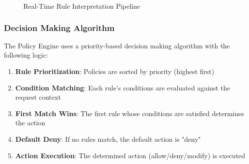 \begin{figure}[H]
\caption{Real-Time Rule Interpretation Pipeline}
\label{fig:rule-interpretation-pipeline}
\end{figure}

\subsubsection{Decision Making Algorithm}

The Policy Engine uses a priority-based decision making algorithm with the following logic:

\begin{enumerate}
    \item \textbf{Rule Prioritization}: Policies are sorted by priority (highest first)
    \item \textbf{Condition Matching}: Each rule's conditions are evaluated against the request context
    \item \textbf{First Match Wins}: The first rule whose conditions are satisfied determines the action
    \item \textbf{Default Deny}: If no rules match, the default action is "deny"
    \item \textbf{Action Execution}: The determined action (allow/deny/modify) is executed
\end{enumerate}

